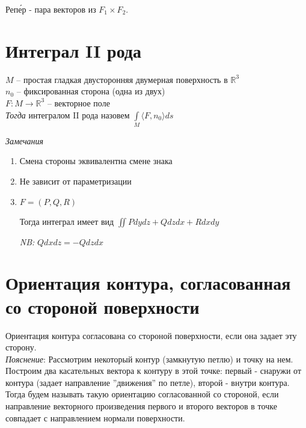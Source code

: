 \documentclass[paper=a4, fontsize=17pt]{article}
\begin{document}
	Реп\'{е}р - пара векторов из $F_1 \times F_2$. 
	
	\section{Интеграл II рода}
	
	$M$ -- простая гладкая двусторонняя двумерная поверхность в $\mathbb{R}^3$\\
	$n_0$ -- фиксированная сторона (одна из двух)\\
	$F : M \rightarrow \mathbb{R}^3$ -- векторное поле\\
	
	\emph{Тогда} интегралом II рода назовем $\int\limits_{M} \langle F, n_0 \rangle ds$
	
	\emph{Замечания}
	\begin{enumerate}
		\item Смена стороны эквивалентна смене знака
		\item Не зависит от параметризации
		\item 
		$F=(P, Q, R)$
		
		Тогда интеграл имеет вид $\iint P dydz + Q dzdx + R dxdy$
		
		\emph{NB:} $Q dxdz = -Q dzdx$
	\end{enumerate}
	
	\section{Ориентация контура, согласованная со стороной поверхности}
	
	Ориентация контура согласована со стороной поверхности, если она задает эту сторону.\\
	
	\emph{Пояснение}: 
	Рассмотрим некоторый контур (замкнутую петлю) и точку на нем. Построим два касательных вектора к контуру в этой точке: первый - снаружи от контура (задает направление ''движения'' по петле), второй - внутри контура. Тогда будем называть такую ориентацию согласованной со стороной, если направление векторного произведения первого и второго векторов в точке совпадает с направлением нормали поверхности.
	
	\begin{center}
	\end{center}
	
\end{document}
